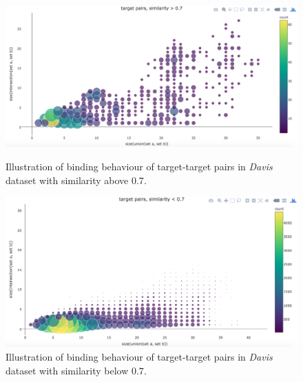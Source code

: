 \begin{figure}[p]
\begin{center}
\includegraphics[scale=0.36]{davis_targets_above.png}
\end{center}
\caption[Correlation of target-similarity and binding behaviour, similar target pairs, \textit{Davis} dataset]{Illustration of binding behaviour of target-target pairs in \textit{Davis} dataset with similarity above $0.7$.}
\label{fig:davis_target_simi_corr_1}
\begin{center}
\includegraphics[scale=0.36]{davis_targets_below.png}
\end{center}
\caption[Correlation of target-similarity and binding behaviour, un-similar target pairs, \textit{Davis} dataset]{Illustration of binding behaviour of target-target pairs in \textit{Davis} dataset with similarity below $0.7$.}
\label{fig:davis_target_simi_corr_2}
\end{figure}





